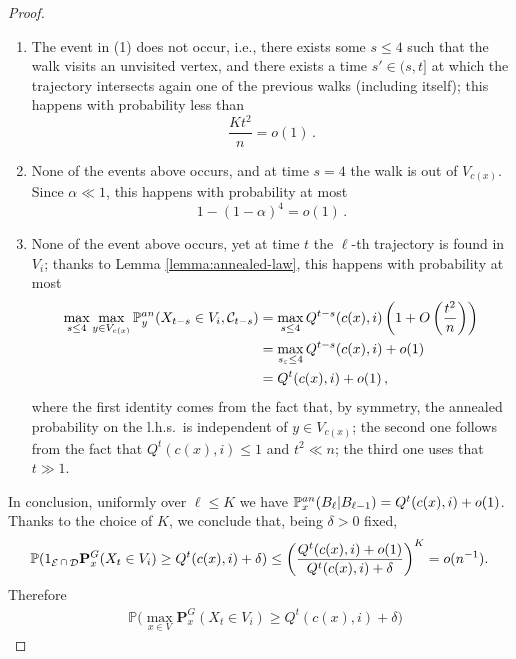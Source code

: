 \documentclass[10pt,a4paper]{amsart}
\DeclareMathOperator{\cD}{\mathcal{D}}
\DeclareMathOperator{\cE}{\mathcal{E}}
\newcommand{\eps}{\varepsilon}
\newcommand{\lhs}{{l.h.s.~}}
\newcommand{\one}{\textup{\textbf{1}}}
\newcommand{\p}{\mathbb{P}}
\newcommand{\pan}{\p^{\textup{an}}}
\newcommand{\quenchG}{\mathbf{P}^G}
\newcommand{\s}{{s_\eps}}
\newcommand{\semi}{{Q}}
\begin{document}
\begin{proof}
\begin{enumerate}
        $$8K(C_1\log(n))^{-4}=o(1)\,.$$
				\item[(2)] The event in (1) does not occur, i.e., there exists some $s\le 4$ such that the walk visits an unvisited vertex, and there exists a time $s'\in(s,t]$ at which the trajectory intersects again one of the previous walks (including itself); this happens with probability less than 
                $$\frac{Kt^2}{n}=o(1)\,.$$
                \item[(3)] None of the events above occurs, and at time $s=4$ the walk is out of $V_{c(x)}$.  
                Since  $\alpha\ll 1$, this happens with probability at most
                $$1-(1-\alpha)^4=o(1)\,.$$
				\item[(4)] None of the event above occurs, yet at time $t$ the $\ell$-th trajectory is found in $V_i$; thanks to Lemma \ref{lemma:annealed-law}, this happens with probability at most
				\begin{align*}
					\max_{s\le 4}\max_{y\in V_{c(x)}}\pan_y(X_{t-s}\in V_i,\mathcal{C}_{t-s})&=\max_{s\le 4}\semi^{t-s}(c(x),i)\left(1+O\left(\frac{t^2}n\right)\right)\\
				&=\max_{\s\le 4}\semi^{t-s}(c(x),i)+o(1)\\
					&=\semi^{t}(c(x),i)+o(1)\,,
				\end{align*}
                where the first identity comes from the fact that, by symmetry, the annealed probability on the \lhs is independent of $y\in V_{c(x)}$; the second one follows from the fact that $\semi^t(c(x),i)\le 1$ and $t^2\ll n$;
                the third one uses that $t\gg 1$. 
			\end{enumerate}
			In conclusion,  uniformly over ${\ell}\le K$ we have $\pan_x(B_{\ell}|B_{{\ell}-1})=\semi^t(c(x),i)+o(1)$.
			Thanks to the choice of $K$, we conclude that, being $\delta>0$ fixed,
			\begin{equation}
	\p(\one_{\cE\cap\cD}\quenchG_x(X_t\in V_i)\ge\semi^t(c(x),i)+ \delta)
			\le \left(\frac{\semi^t(c(x),i)+o(1)}{\semi^t(c(x),i)+\delta}\right)^K 
			=o(n^{-1}).
			\end{equation}
			Therefore
   			\begin{equation}\label{eq:319}
            \begin{split}
				&\p\big(\max_{x \in V}\quenchG_x(X_t\in V_i)\ge \semi^t(c(x),i)+\delta\big)

\end{split}
\end{equation}
\end{proof}
\end{document}
